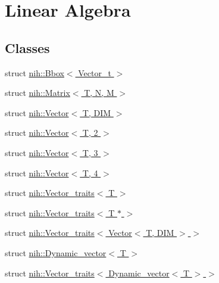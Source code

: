 \hypertarget{group__linalg}{
\section{\-Linear \-Algebra}
\label{group__linalg}
}
\subsection*{\-Classes}
\begin{DoxyCompactItemize}
\item 
struct \hyperlink{structnih_1_1_bbox}{nih\-::\-Bbox$<$ Vector\-\_\-t $>$}
\item 
struct \hyperlink{structnih_1_1_matrix}{nih\-::\-Matrix$<$ T, N, M $>$}
\item 
struct \hyperlink{structnih_1_1_vector}{nih\-::\-Vector$<$ T, D\-I\-M $>$}
\item 
struct \hyperlink{structnih_1_1_vector_3_01_t_00_012_01_4}{nih\-::\-Vector$<$ T, 2 $>$}
\item 
struct \hyperlink{structnih_1_1_vector_3_01_t_00_013_01_4}{nih\-::\-Vector$<$ T, 3 $>$}
\item 
struct \hyperlink{structnih_1_1_vector_3_01_t_00_014_01_4}{nih\-::\-Vector$<$ T, 4 $>$}
\item 
struct \hyperlink{structnih_1_1_vector__traits}{nih\-::\-Vector\-\_\-traits$<$ T $>$}
\item 
struct \hyperlink{structnih_1_1_vector__traits_3_01_t_01_5_01_4}{nih\-::\-Vector\-\_\-traits$<$ T $\ast$ $>$}
\item 
struct \hyperlink{structnih_1_1_vector__traits_3_01_vector_3_01_t_00_01_d_i_m_01_4_01_4}{nih\-::\-Vector\-\_\-traits$<$ Vector$<$ T, D\-I\-M $>$ $>$}
\item 
struct \hyperlink{structnih_1_1_dynamic__vector}{nih\-::\-Dynamic\-\_\-vector$<$ T $>$}
\item 
struct \hyperlink{structnih_1_1_vector__traits_3_01_dynamic__vector_3_01_t_01_4_01_4}{nih\-::\-Vector\-\_\-traits$<$ Dynamic\-\_\-vector$<$ T $>$ $>$}
\end{DoxyCompactItemize}

